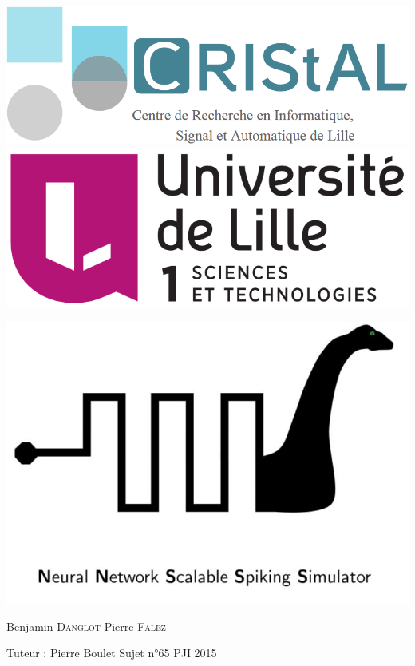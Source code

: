 \documentclass[a4paper,10pt]{article}
\begin{document}

\includegraphics[scale=0.1]{image/cristal.png}
\hfill
\includegraphics[scale=0.1]{image/lille1.png}

\vspace*{4cm}

\includegraphics[scale=0.4]{image/n2s3.jpg}

\vfill
{\LARGE
\noindent
	Benjamin \textsc{Danglot}\newline
	Pierre \textsc{Falez}
}

\vfill
{
\noindent
{\LARGE Tuteur : Pierre Boulet} \hfill Sujet n°65 PJI 2015 
}

\newpage

\end{document}

